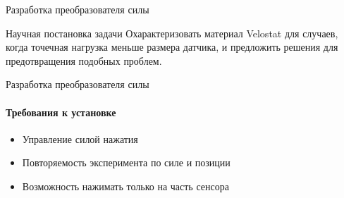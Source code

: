 \documentclass[aspectratio=169,xcolor=table]{beamer}
\begin{document}
\begin{frame}[t]{Разработка преобразователя силы}
\begin{multicols}{2}
\begin{figure}[H]
                \label{fig:velostat_pressure_resistance.jpg}
            \end{figure}
    \end{multicols}
    \vspace{-12pt}
    \begin{block}{Научная постановка задачи}
        Охарактеризовать материал Velostat для случаев, когда точечная нагрузка меньше размера датчика, и предложить решения для предотвращения подобных проблем.
    \end{block}
\end{frame}

\begin{frame}[t]{Разработка преобразователя силы}
    \framesubtitle{Требования к установке}
    \vspace{-0.5cm}
    {\large
        \begin{itemize}
            \item Управление силой нажатия 
            \item Повторяемость эксперимента по силе и позиции 
            \item Возможность нажимать только на часть сенсора 
        \end{itemize}}
\end{frame}
\end{document}
